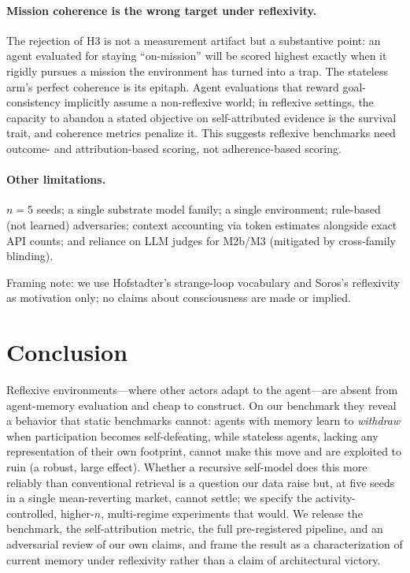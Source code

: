 \documentclass{article}
\begin{document}
\paragraph{Mission coherence is the wrong target under reflexivity.} The rejection of H3 is not a measurement artifact but a substantive point: an agent evaluated for staying ``on-mission'' will be scored highest exactly when it rigidly pursues a mission the environment has turned into a trap. The stateless arm's perfect coherence is its epitaph. Agent evaluations that reward goal-consistency implicitly assume a non-reflexive world; in reflexive settings, the capacity to abandon a stated objective on self-attributed evidence is the survival trait, and coherence metrics penalize it. This suggests reflexive benchmarks need outcome- and attribution-based scoring, not adherence-based scoring.

\paragraph{Other limitations.} $n=5$ seeds; a single substrate model family; a single environment; rule-based (not learned) adversaries; context accounting via token estimates alongside exact API counts; and reliance on LLM judges for M2b/M3 (mitigated by cross-family blinding).

Framing note: we use Hofstadter's strange-loop vocabulary and Soros's reflexivity as motivation only; no claims about consciousness are made or implied.

\section{Conclusion}
Reflexive environments---where other actors adapt to the agent---are absent from agent-memory evaluation and cheap to construct. On our benchmark they reveal a behavior that static benchmarks cannot: agents with memory learn to \emph{withdraw} when participation becomes self-defeating, while stateless agents, lacking any representation of their own footprint, cannot make this move and are exploited to ruin (a robust, large effect). Whether a recursive self-model does this more reliably than conventional retrieval is a question our data raise but, at five seeds in a single mean-reverting market, cannot settle; we specify the activity-controlled, higher-$n$, multi-regime experiments that would. We release the benchmark, the self-attribution metric, the full pre-registered pipeline, and an adversarial review of our own claims, and frame the result as a characterization of current memory under reflexivity rather than a claim of architectural victory.
\end{document}
